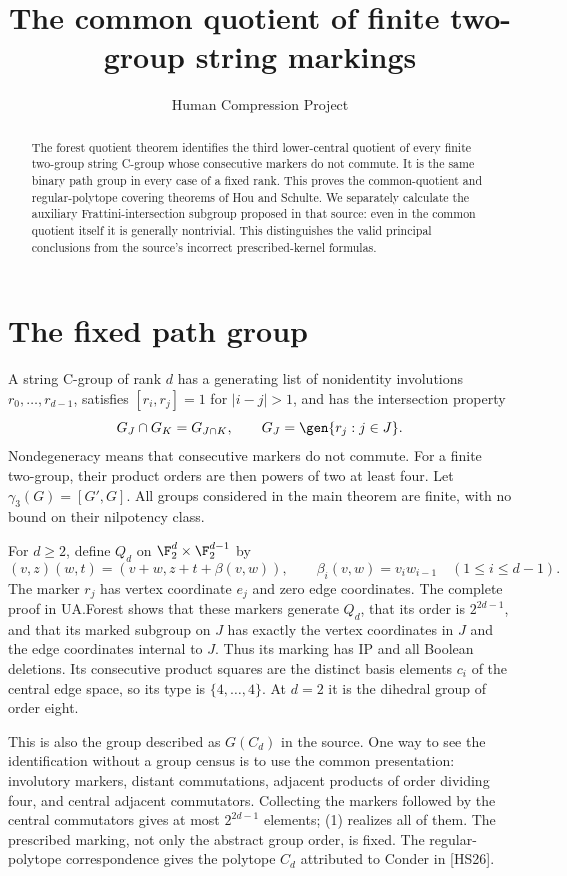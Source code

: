 
\title{The common quotient of finite two-group string markings}
\author{Human Compression Project}
\date{}

\maketitle
\begin{abstract}
The forest quotient theorem identifies the third lower-central quotient of
every finite two-group string C-group whose consecutive markers do not
commute. It is the same binary path group in every case of a fixed rank.
This proves the common-quotient and regular-polytope covering theorems of
Hou and Schulte. We separately calculate the auxiliary Frattini-intersection
subgroup proposed in that source: even in the common quotient itself it is
generally nontrivial. This distinguishes the valid principal conclusions
from the source's incorrect prescribed-kernel formulas.
\end{abstract}

\section{The fixed path group}
A string C-group of rank $d$ has a generating list of nonidentity involutions
$r_0,\ldots,r_{d-1}$, satisfies $[r_i,r_j]=1$ for $|i-j|>1$, and has
the intersection property
\[
 G_J\cap G_K=G_{J\cap K},\qquad G_J=\gen{r_j:j\in J}.
\]
Nondegeneracy means that consecutive markers do not commute. For a finite
two-group, their product orders are then powers of two at least four.
Let $\gamma_3(G)=[G',G]$. All groups considered in the main theorem are
finite, with no bound on their nilpotency class.

For $d\ge2$, define $Q_d$ on $\F_2^d\times\F_2^{d-1}$ by
\[
 (v,z)(w,t)=(v+w,z+t+\beta(v,w)),\qquad
 \beta_i(v,w)=v_iw_{i-1}\quad(1\le i\le d-1).              \tag{1}
\]
The marker $r_j$ has vertex coordinate $e_j$ and zero edge coordinates.
The complete proof in UA.Forest shows that these markers generate $Q_d$,
that its order is $2^{2d-1}$, and that its marked subgroup on $J$ has
exactly the vertex coordinates in $J$ and the edge coordinates internal
to $J$. Thus its marking has IP and all Boolean deletions. Its consecutive
product squares are the distinct basis elements $c_i$ of the central edge
space, so its type is $\{4,\ldots,4\}$. At $d=2$ it is the dihedral
group of order eight.

This is also the group described as $G(C_d)$ in the source. One way to see
the identification without a group census is to use the common presentation:
involutory markers, distant commutations, adjacent products of order dividing
four, and central adjacent commutators. Collecting the markers followed by
the central commutators gives at most $2^{2d-1}$ elements; (1) realizes all
of them. The prescribed marking, not only the abstract group order, is fixed.
The regular-polytope correspondence gives the polytope $C_d$ attributed to
Conder in [HS26].

